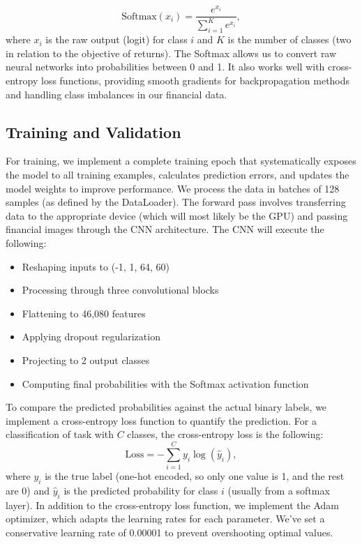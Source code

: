 \documentclass[12pt]{article}
\begin{document}
\begin{equation}
	\text{Softmax}(x_i)=\frac{e^{x_i}}{\sum_{i=1}^K e^{x_i}},
\end{equation}
where $x_i$ is the raw output (logit) for class $i$ and $K$ is the number of classes (two in relation to the objective of returns). The Softmax allows us to convert raw neural networks into probabilities between 0 and 1. It also works well with cross-entropy loss functions, providing smooth gradients for backpropagation methods and handling class imbalances in our financial data.

\subsection*{Training and Validation}

For training, we implement a complete training epoch that systematically exposes the model to all training examples, calculates prediction errors, and updates the model weights to improve performance. We process the data in batches of 128 samples (as defined by the DataLoader). The forward pass involves transferring data to the appropriate device (which will most likely be the GPU) and passing financial images through the CNN architecture. The CNN will execute the following:

\begin{itemize}
	\item Reshaping inputs to (-1, 1, 64, 60)
	\item Processing through three convolutional blocks
	\item Flattening to 46,080 features
	\item Applying dropout regularization
	\item Projecting to 2 output classes
	\item Computing final probabilities with the Softmax activation function
\end{itemize}
To compare the predicted probabilities against the actual binary labels, we implement a cross-entropy loss function to quantify the prediction. For a classification of task with $C$ classes, the cross-entropy loss is the following:
\begin{equation}
	\text{Loss}=-\sum_{i=1}^{C}y_i\log\left(\hat{y}_i\right),
\end{equation}
where $y_i$ is the true label (one-hot encoded, so only one value is 1, and the rest are 0) and $\hat{y}_i$ is the predicted probability for class $i$ (usually from a softmax layer). In addition to the cross-entropy loss function, we implement the Adam optimizer, which adapts the learning rates for each parameter. We've set a conservative learning rate of 0.00001 to prevent overshooting optimal values.
\end{document}

